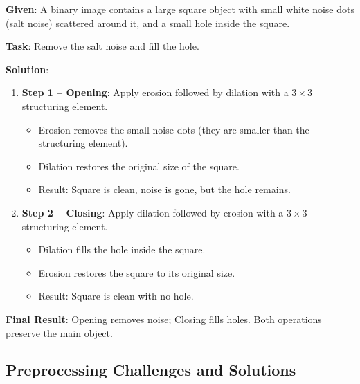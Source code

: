 \documentclass[11pt,a4paper]{article}
\begin{document}
\begin{tcolorbox}[colback=yellow!5!white,colframe=yellow!75!black,title=\textbf{Worked Example 4: Morphological Opening and Closing}]
\textbf{Given}: A binary image contains a large square object with small white noise dots (salt noise) scattered around it, and a small hole inside the square.

\textbf{Task}: Remove the salt noise and fill the hole.

\textbf{Solution}:
\begin{enumerate}
    \item \textbf{Step 1 -- Opening}: Apply erosion followed by dilation with a $3 \times 3$ structuring element.
    \begin{itemize}
        \item Erosion removes the small noise dots (they are smaller than the structuring element).
        \item Dilation restores the original size of the square.
        \item Result: Square is clean, noise is gone, but the hole remains.
    \end{itemize}
    \item \textbf{Step 2 -- Closing}: Apply dilation followed by erosion with a $3 \times 3$ structuring element.
    \begin{itemize}
        \item Dilation fills the hole inside the square.
        \item Erosion restores the square to its original size.
        \item Result: Square is clean with no hole.
    \end{itemize}
\end{enumerate}

\textbf{Final Result}: Opening removes noise; Closing fills holes. Both operations preserve the main object.
\end{tcolorbox}

\subsection{Preprocessing Challenges and Solutions}
\end{document}
